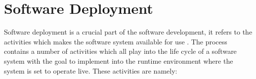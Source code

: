 
\section{Software Deployment}

Software deployment is a crucial part of the software development, it refers to the activities which makes the software system available for use \cite{carzaniga1998characterization}. The process contains a number of activities which all play into the life cycle of a software system with the goal to implement into the runtime environment where the system is set to operate live. These activities are namely: \\

